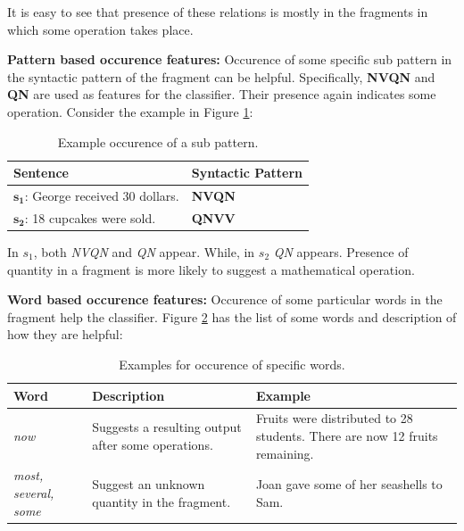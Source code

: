 \documentclass[11pt]{article}
\begin{document}
It is easy to see that presence of these relations is mostly in the fragments in which some operation takes place.

\textbf{Pattern based occurence features:} Occurence of some specific sub pattern in the syntactic pattern of the fragment can be helpful. Specifically, \textbf{NVQN} and \textbf{QN} are used as features for the classifier. Their presence again indicates some operation. Consider the example in Figure \ref{figure:16}:

\begin{table}[h!]
\centering
\begin{tabular}{ | m{20em} | m{5em} |}
\hline
 \textbf{Sentence} & \textbf{Syntactic Pattern}\\
\hline
$\mathbf{s_{1}}$: George received 30 dollars. & \textbf{NVQN} \\
\hline
$\mathbf{s_{2}}$: 18 cupcakes were sold. & \textbf{QNVV} \\
\hline
\end{tabular}
\caption{Example occurence of a sub pattern.}
\label{figure:16}
\end{table}

In \begin{math}s_{1}\end{math}, both \textit{NVQN} and \textit{QN} appear. While, in \begin{math}s_{2}\end{math} \textit{QN} appears. Presence of quantity in a fragment is more likely to suggest a mathematical operation. 

\textbf{Word based occurence features:} Occurence of some particular words in the fragment help the classifier. Figure \ref{figure:17} has the list of some words and description of how they are helpful:

\begin{table}[h!]
\centering
\begin{tabular}{ | m{5em} | m{10em} | m{10em} | }
\hline
 \textbf{Word} & \textbf{Description} & \textbf{Example}\\
\hline
\textit{now} & Suggests a resulting output after some operations. & Fruits were distributed to 28 students. There are now 12 fruits remaining. \\
\hline
\textit{most, several, some} & Suggest an unknown quantity in the fragment. & Joan gave some of her seashells to Sam. \\
\hline
\end{tabular}
\caption{Examples for occurence of specific words.}
\label{figure:17}
\end{table}
\end{document}
